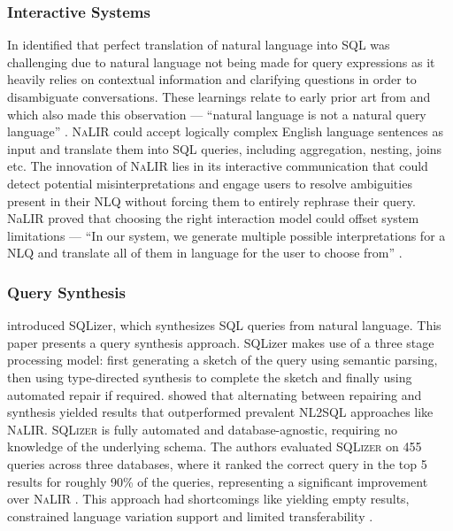 \subsubsection{Interactive Systems}

In \citeyear{NALIR} \citeauthor*{NALIR} identified that perfect translation of
natural language into SQL was challenging due to natural language not being
made for query expressions as it heavily relies on contextual information and
clarifying questions in order to disambiguate conversations. These learnings
relate to early prior art from \citeauthor{UnnaturalQueryLanguage} and
\citeauthor{Rendezvous} which also made this observation — ``natural language
is not a natural query language'' \citep{UnnaturalQueryLanguage}.
\textsc{NaLIR} could accept logically complex English language sentences as
input and translate them into SQL queries, including aggregation, nesting,
joins etc. The innovation of \textsc{NaLIR} lies in its interactive
communication that could detect potential misinterpretations and engage users
to resolve ambiguities present in their NLQ without forcing
them to entirely rephrase their query. NaLIR proved that choosing the right
interaction model could offset system limitations — ``In our system, we
generate multiple possible interpretations for a NLQ and
translate all of them in  language for the user to choose from''
\citep{NALIR}.

\subsubsection{Query Synthesis}

\citeauthor{SQLizer} introduced SQLizer, which synthesizes SQL queries from
natural language. This paper presents a query synthesis approach. SQLizer makes
use of a three stage processing model: first generating a sketch of the query
using semantic parsing, then using type-directed synthesis to complete the
sketch and finally using automated repair if required. \citeauthor*{SQLizer}
showed that alternating between repairing and synthesis yielded results that
outperformed prevalent NL2SQL approaches like \textsc{NaLIR}. \textsc{SQLizer}
is fully automated and database-agnostic, requiring no knowledge of the
underlying schema. The authors evaluated \textsc{SQLizer} on 455 queries across
three databases, where it ranked the correct query in the top 5 results for
roughly 90\% of the queries, representing a significant improvement over
\textsc{NaLIR} \citep{NALIR}. This approach had shortcomings like yielding
empty results, constrained language variation support and limited
transferability \citep[p.22-23]{SQLizer}.

